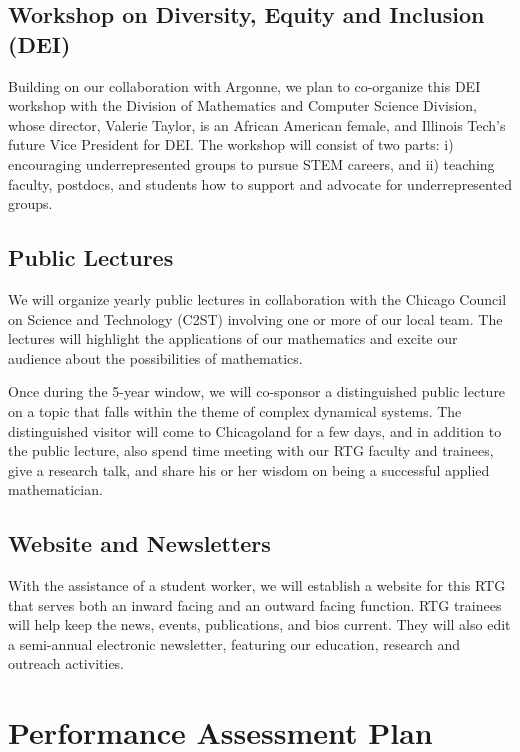 \documentclass[11pt]{NSFamsart}
\begin{document}
\subsection*{Workshop on Diversity, Equity and Inclusion (DEI)}
Building on our collaboration with Argonne, we plan to co-organize this DEI workshop with the Division of Mathematics and Computer Science Division, whose director, Valerie Taylor, is an African American female, and Illinois Tech's future Vice President for DEI.  The workshop will consist of two parts: i) encouraging underrepresented groups to pursue STEM careers, and ii) teaching faculty, postdocs, and students how to support and advocate for underrepresented groups.

\subsection*{Public Lectures} We will organize yearly public lectures in collaboration with the Chicago Council on Science and Technology (C2ST) involving one or more of our local team.  The lectures will highlight the applications of our mathematics and excite our audience about the possibilities of mathematics.  

Once during the 5-year window, we will co-sponsor a distinguished public lecture  on a topic that falls within the theme of complex dynamical systems.  The distinguished visitor will come to Chicagoland for a few days, and in addition to the public lecture, also spend time meeting with our RTG faculty and trainees, give a research talk, and share his or her wisdom on being a successful applied mathematician. 

\subsection*{Website and Newsletters} 
With the assistance of a student worker, we will establish a website for this RTG that serves both an inward facing and an outward facing function.  RTG trainees will help keep the news, events, publications, and bios current.  They will also edit a semi-annual electronic newsletter, 
featuring our education, research  and outreach  activities. 



\section{Performance Assessment Plan  }
 
\end{document}
